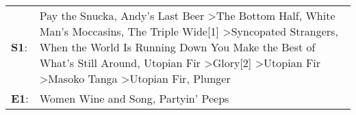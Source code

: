 \begin{supertabular}{p{0.03\textwidth}p{0.92\textwidth}}
 \textbf{S1}:  &  Pay the Snucka\textsuperscript{}, \enspace Andy's Last Beer\textsuperscript{} \textgreater \enspace The Bottom Half\textsuperscript{}, \enspace White Man's Moccasins\textsuperscript{}, \enspace The Triple Wide[1]\textsuperscript{} \textgreater \enspace Syncopated Strangers\textsuperscript{}, \enspace When the World Is Running Down You Make the Best of What's Still Around\textsuperscript{}, \enspace Utopian Fir\textsuperscript{} \textgreater \enspace Glory[2]\textsuperscript{} \textgreater \enspace Utopian Fir\textsuperscript{} \textgreater \enspace Masoko Tanga\textsuperscript{} \textgreater \enspace Utopian Fir\textsuperscript{}, \enspace Plunger\textsuperscript{}  \enspace  \\
 \textbf{E1}:  &                                                                                                                                                                                                                                                                                                                                                                                                                                                                                                                                                                                                                   Women Wine and Song\textsuperscript{}, \enspace Partyin' Peeps\textsuperscript{}  \enspace  \\
\end{supertabular}
